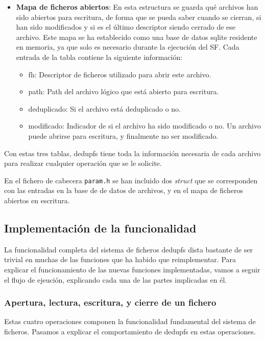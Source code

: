 \documentclass[12pt,a4paper]{article}
\begin{document}
\begin{itemize}
  \item \textbf{Mapa de ficheros abiertos}: En esta estructura se guarda qué archivos han sido abiertos para escritura, de forma que se pueda saber cuando se cierran, si han sido modificados y si es el último descriptor siendo cerrado de ese archivo. Este mapa se ha establecido como una base de datos sqlite residente en memoria, ya que solo es necesario durante la ejecución del SF. Cada entrada de la tabla contiene la siguiente información:
  \begin{itemize}
   \item fh: Descriptor de ficheros utilizado para abrir este archivo.
   \item path: Path del archivo lógico que está abierto para escritura.
   \item deduplicado: Si el archivo está deduplicado o no.
   \item modificado: Indicador de si el archivo ha sido modificado o no. Un archivo puede abrirse para escritura, y finalmente no ser modificado.
  \end{itemize}
\end{itemize}

Con estas tres tablas, dedupfs tiene toda la información necesaria de cada archivo para realizar cualquier operación que se le solicite.

En el fichero de cabecera \texttt{\small param.h} se han incluido dos \emph{struct} que se corresponden con las entradas en la base de de datos de archivos, y en el mapa de ficheros abiertos en escritura.

\subsection{Implementación de la funcionalidad}

La funcionalidad completa del sistema de ficheros dedupfs dista bastante de ser trivial en muchas de las funciones que ha habido que reimplementar. Para explicar el funcionamiento de las nuevas funciones implementadas, vamos a seguir el flujo de ejeución, explicando cada una de las partes implicadas en él.

\subsubsection{Apertura, lectura, escritura, y cierre de un fichero}

Estas cuatro operaciones componen la funcionalidad fundamental del sistema de ficheros. Pasamos a explicar el comportamiento de dedupfs en estas operaciones.
\end{document}
